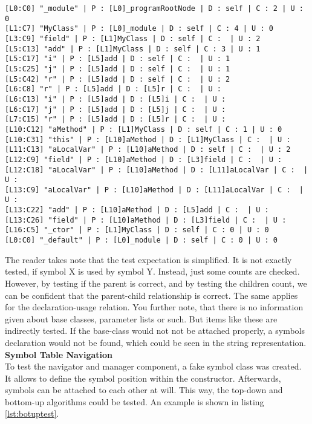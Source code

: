 \begin{verbatim}
[L0:C0] "_module" | P : [L0]_programRootNode | D : self | C : 2 | U : 0
[L1:C7] "MyClass" | P : [L0]_module | D : self | C : 4 | U : 0
[L3:C9] "field" | P : [L1]MyClass | D : self | C :  | U : 2
[L5:C13] "add" | P : [L1]MyClass | D : self | C : 3 | U : 1
[L5:C17] "i" | P : [L5]add | D : self | C :  | U : 1
[L5:C25] "j" | P : [L5]add | D : self | C :  | U : 1
[L5:C42] "r" | P : [L5]add | D : self | C :  | U : 2
[L6:C8] "r" | P : [L5]add | D : [L5]r | C :  | U :
[L6:C13] "i" | P : [L5]add | D : [L5]i | C :  | U :
[L6:C17] "j" | P : [L5]add | D : [L5]j | C :  | U :
[L7:C15] "r" | P : [L5]add | D : [L5]r | C :  | U :
[L10:C12] "aMethod" | P : [L1]MyClass | D : self | C : 1 | U : 0
[L10:C31] "this" | P : [L10]aMethod | D : [L1]MyClass | C :  | U :
[L11:C13] "aLocalVar" | P : [L10]aMethod | D : self | C :  | U : 2
[L12:C9] "field" | P : [L10]aMethod | D : [L3]field | C :  | U :
[L12:C18] "aLocalVar" | P : [L10]aMethod | D : [L11]aLocalVar | C :  | U :
[L13:C9] "aLocalVar" | P : [L10]aMethod | D : [L11]aLocalVar | C :  | U :
[L13:C22] "add" | P : [L10]aMethod | D : [L5]add | C :  | U :
[L13:C26] "field" | P : [L10]aMethod | D : [L3]field | C :  | U :
[L16:C5] "_ctor" | P : [L1]MyClass | D : self | C : 0 | U : 0
[L0:C0] "_default" | P : [L0]_module | D : self | C : 0 | U : 0
\end{verbatim}

The reader takes note that the test expectation is simplified.
It is not exactly tested, if symbol X is used by symbol Y.
Instead, just some counts are checked.
However, by testing if the parent is correct, and by testing the children count, we can be confident that the parent-child relationship is correct.
The same applies for the declaration-usage relation.
You further note, that there is no information given about base classes, parameter lists or such.
But items like these are indirectly tested.
If the base-class would not not be attached properly,
a symbols declaration would not be found, which could be seen in the string representation.\\

\textbf{Symbol Table Navigation}\\
To test the navigator and manager component, a fake symbol class was created.
It allows to define the symbol position within the constructor.
Afterwards, symbols can be attached to each other at will.
This way, the top-down and bottom-up algorithms could be tested.
An example is shown in listing \ref{lst:botuptest}.

